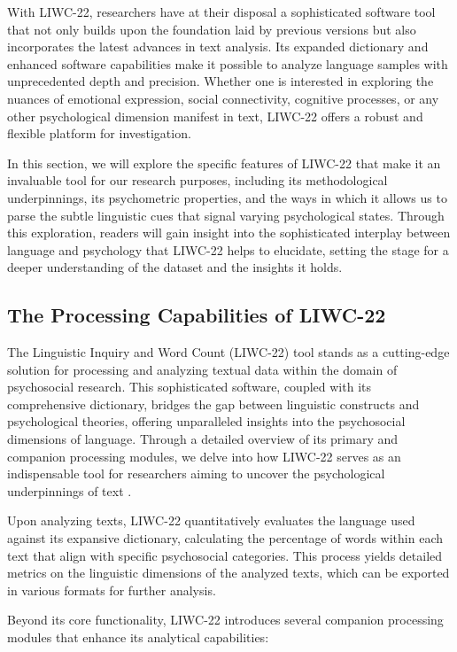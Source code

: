 \quad With LIWC-22, researchers have at their disposal a sophisticated software tool that not only builds upon the foundation laid by previous versions but also incorporates the latest advances in text analysis. Its expanded dictionary and enhanced software capabilities make it possible to analyze language samples with unprecedented depth and precision. Whether one is interested in exploring the nuances of emotional expression, social connectivity, cognitive processes, or any other psychological dimension manifest in text, LIWC-22 offers a robust and flexible platform for investigation.

\quad In this section, we will explore the specific features of LIWC-22 that make it an invaluable tool for our research purposes, including its methodological underpinnings, its psychometric properties, and the ways in which it allows us to parse the subtle linguistic cues that signal varying psychological states. Through this exploration, readers will gain insight into the sophisticated interplay between language and psychology that LIWC-22 helps to elucidate, setting the stage for a deeper understanding of the dataset and the insights it holds.

\subsection{The Processing Capabilities of LIWC-22}

\quad The Linguistic Inquiry and Word Count (LIWC-22) tool stands as a cutting-edge solution for processing and analyzing textual data within the domain of psychosocial research. This sophisticated software, coupled with its comprehensive dictionary, bridges the gap between linguistic constructs and psychological theories, offering unparalleled insights into the psychosocial dimensions of language. Through a detailed overview of its primary and companion processing modules, we delve into how LIWC-22 serves as an indispensable tool for researchers aiming to uncover the psychological underpinnings of text \cite{boyd2022development}.

Upon analyzing texts, LIWC-22 quantitatively evaluates the language used against its expansive dictionary, calculating the percentage of words within each text that align with specific psychosocial categories. This process yields detailed metrics on the linguistic dimensions of the analyzed texts, which can be exported in various formats for further analysis.

Beyond its core functionality, LIWC-22 introduces several companion processing modules that enhance its analytical capabilities:

